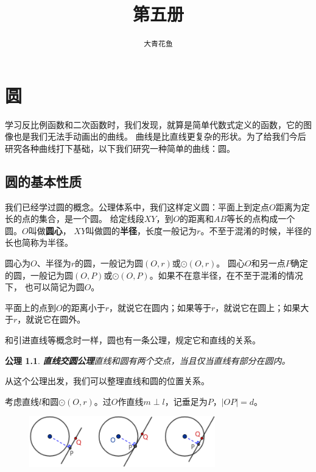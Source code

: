 \documentclass[12pt,UTF8]{ctexbook}
\title{\zihao{0} \bfseries 第五册}
\author{\zihao{2} \texttt{大青花鱼}}
\date{}
\newtheorem{po}{公理}
\begin{document}
\maketitle
\tableofcontents
\newpage

\chapter{圆}

学习反比例函数和二次函数时，我们发现，就算是简单代数式定义的函数，它的图像也是我们无法手动画出的曲线。
曲线是比直线更复杂的形状。为了给我们今后研究各种曲线打下基础，以下我们研究一种简单的曲线：圆。

\section{圆的基本性质}
我们已经学过圆的概念。公理体系中，我们这样定义圆：平面上到定点$O$距离为定长的点的集合，是一个圆。
给定线段$XY$，到$O$的距离和$AB$等长的点构成一个圆。$O$叫做\textbf{圆心}，
$XY$叫做圆的\textbf{半径}，长度一般记为$r$。不至于混淆的时候，半径的长也简称为半径。

圆心为$O$、半径为$r$的圆，一般记为圆$(O, r)$或$\odot{(O, r)}$。
圆心$O$和另一点$P$确定的圆，一般记为圆$(O, P)$或$\odot{(O, P)}$。如果不在意半径，在不至于混淆的情况下，
也可以简记为圆$O$。

平面上的点到$O$的距离小于$r$，就说它在圆内；如果等于$r$，就说它在圆上；如果大于$r$，就说它在圆外。

和引进直线等概念时一样，圆也有一条公理，规定它和直线的关系。
\begin{po}\textbf{直线交圆公理}\label{po:0}
    直线和圆有两个交点，当且仅当直线有部分在圆内。
\end{po}

从这个公理出发，我们可以整理直线和圆的位置关系。

考虑直线$l$和圆$\odot{(O, r)}$。过$O$作直线$m\perp l$，记垂足为$P$，$|OP| = d$。

\begin{figure}[h] %
    \vspace{8pt}
    \centering
    \includegraphics[width=0.72\textwidth]{tu/圆与直线1.png}
\end{figure}
\end{document}

